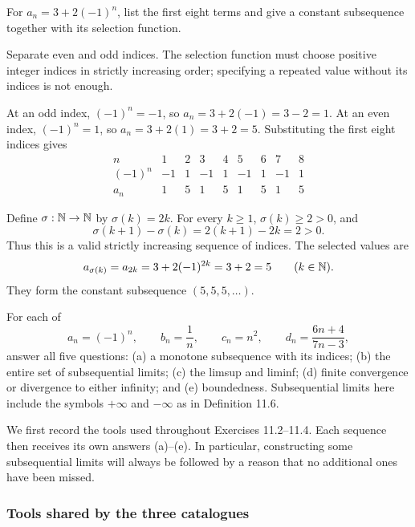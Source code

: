 
\goal For $a_n=3+2(-1)^n$, list the first eight terms and
give a constant subsequence together with its selection function.

\idea Separate even and odd indices. The selection function
must choose positive integer indices in strictly increasing order;
specifying a repeated value without its indices is not enough.

At an odd index, $(-1)^n=-1$, so
$a_n=3+2(-1)=3-2=1$. At an even index, $(-1)^n=1$, so
$a_n=3+2(1)=3+2=5$. Substituting the first eight indices gives
\[
\begin{array}{c|rrrrrrrr}
 n&1&2&3&4&5&6&7&8\\ \hline
 (-1)^n&-1&1&-1&1&-1&1&-1&1\\
 a_n&1&5&1&5&1&5&1&5
\end{array}
\]

Define $\sigma:\mathbb{N}\to\mathbb{N}$ by $\sigma(k)=2k$.
For every $k\geq1$, $\sigma(k)\geq2>0$, and
\[
 \sigma(k+1)-\sigma(k)=2(k+1)-2k=2>0.
\]
Thus this is a valid strictly increasing sequence of indices.
The selected values are
\[
 a_{\sigma(k)}=a_{2k}=3+2(-1)^{2k}=3+2=5
 \qquad(k\in\mathbb{N}).
\]
They form the constant subsequence $(5,5,5,\ldots)$.



\goal For each of
\[
 a_n=(-1)^n,\qquad b_n=\frac1n,\qquad c_n=n^2,
 \qquad d_n=\frac{6n+4}{7n-3},
\]
answer all five questions: (a) a monotone subsequence with its
indices; (b) the entire set of subsequential limits; (c) the
limsup and liminf; (d) finite convergence or divergence to either
infinity; and (e) boundedness. Subsequential limits here include
the symbols $+\infty$ and $-\infty$ as in Definition 11.6.

\idea We first record the tools used throughout Exercises
11.2--11.4. Each sequence then receives its own answers (a)--(e).
In particular, constructing some subsequential limits will always
be followed by a reason that no additional ones have been missed.

\subsubsection*{Tools shared by the three catalogues}

